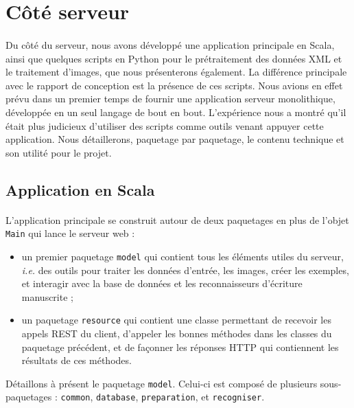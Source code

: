 \section{Côté serveur}

\paragraph{}
Du côté du serveur, nous avons développé une application principale en Scala, ainsi que quelques scripts en Python pour le prétraitement des données XML et le traitement d'images, que nous présenterons également. La différence principale avec le rapport de conception est la présence de ces scripts. Nous avions en effet prévu dans un premier temps de fournir une application serveur monolithique, développée en un seul langage de bout en bout. L'expérience nous a montré qu'il était plus judicieux d'utiliser des scripts comme outils venant appuyer cette application. Nous détaillerons, paquetage par paquetage, le contenu technique et son utilité pour le projet.

\subsection{Application en Scala}

\paragraph{}
L'application principale se construit autour de deux paquetages en plus de l'objet \texttt{Main} qui lance le serveur web :
\begin{itemize}
\item un premier paquetage \texttt{model} qui contient tous les éléments utiles du serveur, \textit{i.e.} des outils pour traiter les données d'entrée, les images, créer les exemples, et interagir avec la base de données et les reconnaisseurs d'écriture manuscrite ;
\item un paquetage \texttt{resource} qui contient une classe permettant de recevoir les appels REST du client, d'appeler les bonnes méthodes dans les classes du paquetage précédent, et de façonner les réponses HTTP qui contiennent les résultats de ces méthodes.
\end{itemize}
Détaillons à présent le paquetage \texttt{model}. Celui-ci est composé de plusieurs sous-paquetages : \texttt{common}, \texttt{database}, \texttt{preparation}, et \texttt{recogniser}.

